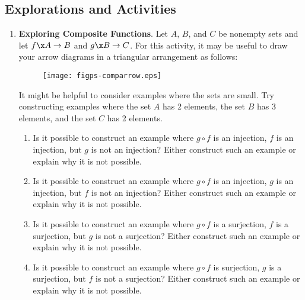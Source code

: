 \subsection*{Explorations and Activities}
\setcounter{oldenumi}{\theenumi}
\begin{enumerate} \setcounter{enumi}{\theoldenumi}
  \item \textbf{Exploring Composite Functions}.  \label{exer:exploringcomposite}
Let  $A$, $B$, and  $C$  be nonempty sets and let  $f\x A \to B$  and  $g\x B \to C$.  For this activity, it may be useful to draw your arrow diagrams in a triangular arrangement as follows:
\begin{figure}[h]
\begin{center}
\texttt{[image: figps-comparrow.eps]}
\end{center}
\end{figure}

It might be helpful to consider examples where the sets are small.  Try constructing examples where the set $A$ has 2 elements, the set $B$ has 3 elements, and the set $C$ has 2 elements.

\begin{enumerate}
\item Is it possible to construct an example where  $g \circ f$  is an injection,  $f$  is an injection, but  
$g$  is not an injection?  Either construct such an example or explain why it is not possible.  %

\item Is it possible to construct an example where  $g \circ f$  is an injection,  $g$  is an injection, but  $f$  is not an injection?  Either construct such an example or explain why it is not possible.  %

\item Is it possible to construct an example where  $g \circ f$  is a surjection,  $f$  is a surjection, but  $g$  is not a surjection?  Either construct such an example or explain why it is not possible.  

\item Is it possible to construct an example where  $g \circ f$  is surjection,  $g$  is a surjection, but  $f$  is not a surjection?  Either construct such an example or explain why it is not possible.
\end{enumerate}



\end{enumerate}
